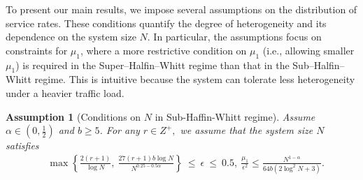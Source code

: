 \documentclass[11pt,oneside,letter]{article}
\newtheorem{assumption}{Assumption}
\begin{document}
To present our main results, we impose several assumptions on the distribution of service rates. These conditions quantify the degree of heterogeneity and its dependence on the system size $N$. In particular, the assumptions focus on constraints for $\mu_1$, where a more restrictive condition on $\mu_1$ (i.e., allowing smaller $\mu_1$) is required in the Super–Halfin–Whitt regime than that in the Sub–Halfin–Whitt regime. This is intuitive because the system can tolerate less heterogeneity under a heavier traffic load.   
\begin{assumption}[Conditions on \(N\) in Sub-Haffin-Whitt regime]
Assume $\alpha \in (0, \tfrac{1}{2})$ and $b \geq 5$. {For any $r \in Z^{+},$} we assume that the system size $N$ satisfies
\begin{align*}
&\max\left\{
\frac{2(r+1)}{\log N},\
\frac{27(r+1)b\log N}{N^{0.25-0.5\alpha}}
\right\}
\ \leq\ 
\epsilon
\ \leq\
0.5, ~ \frac{\mu_1}{\epsilon^2} \leq \frac{N^{1-\alpha}}{64b(2\log^2 N + 3)}.
\end{align*} \label{assumption: sub}
\end{assumption}
\end{document}
